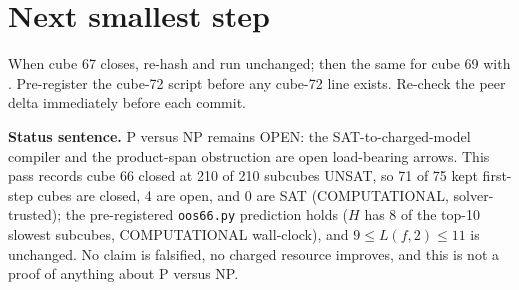 \documentclass[11pt]{article}
\begin{document}
\section*{Next smallest step}
When cube 67 closes, re-hash and run  unchanged; then the same for cube 69 with . Pre-register the cube-72 script before any cube-72 line exists. Re-check the peer delta immediately before each commit.

\bigskip
\noindent\textbf{Status sentence.} P versus NP remains OPEN: the SAT-to-charged-model compiler and the product-span obstruction are open load-bearing arrows. This pass records cube 66 closed at 210 of 210 subcubes UNSAT, so 71 of 75 kept first-step cubes are closed, 4 are open, and 0 are SAT (COMPUTATIONAL, solver-trusted); the pre-registered \texttt{oos66.py} prediction holds ($H$ has 8 of the top-10 slowest subcubes, COMPUTATIONAL wall-clock), and $9\le L(f,2)\le 11$ is unchanged. No claim is falsified, no charged resource improves, and this is not a proof of anything about P versus NP.
\end{document}
